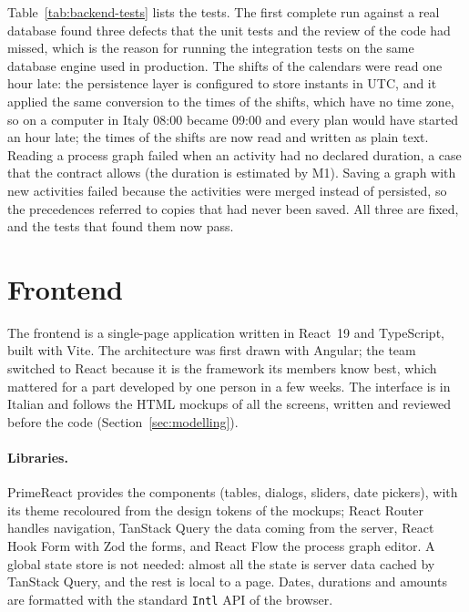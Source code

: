 Table~\ref{tab:backend-tests} lists the tests. The first complete run against a real database
found three defects that the unit tests and the review of the code had missed, which is the
reason for running the integration tests on the same database engine used in production. The
shifts of the calendars were read one hour late: the persistence layer is configured to store
instants in UTC, and it applied the same conversion to the times of the shifts, which have no
time zone, so on a computer in Italy 08:00 became 09:00 and every plan would have started an
hour late; the times of the shifts are now read and written as plain text. Reading a process
graph failed when an activity had no declared duration, a case that the contract allows (the
duration is estimated by M1). Saving a graph with new activities failed because the activities
were merged instead of persisted, so the precedences referred to copies that had never been
saved. All three are fixed, and the tests that found them now pass.

\section{Frontend}
\label{sec:impl-frontend}

The frontend is a single-page application written in React~19 and TypeScript, built with Vite.
The architecture was first drawn with Angular; the team switched to React because it is the
framework its members know best, which mattered for a part developed by one person in a few
weeks. The interface is in Italian and follows the HTML mockups of all the screens, written and
reviewed before the code (Section~\ref{sec:modelling}).

\paragraph{Libraries.} PrimeReact provides the components (tables, dialogs, sliders, date
pickers), with its theme recoloured from the design tokens of the mockups; React Router handles
navigation, TanStack Query the data coming from the server, React Hook Form with Zod the forms,
and React Flow the process graph editor. A global state store is not needed: almost all the state
is server data cached by TanStack Query, and the rest is local to a page. Dates, durations and
amounts are formatted with the standard \texttt{Intl} API of the browser.

